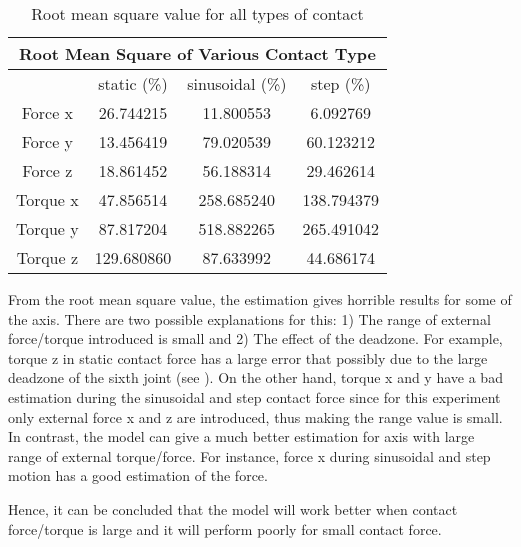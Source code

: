 \begin{table}[H]
    \centering
    \begin{tabular}{| c | c | c | c |}
    \hline
    \multicolumn{4}{|c|}{Root Mean Square of Various Contact Type} \\\hline
              & static (\%) & sinusoidal (\%)  & step (\%)    \\ \hline
    Force x   & 26.744215   &  11.800553       &  6.092769    \\ \hline
    Force y   & 13.456419   &  79.020539       &  60.123212   \\ \hline
    Force z   & 18.861452   &  56.188314       &  29.462614   \\ \hline
    Torque x  & 47.856514   &  258.685240      &  138.794379  \\ \hline
    Torque y  & 87.817204   &  518.882265      &  265.491042  \\ \hline
    Torque z  & 129.680860  &  87.633992       &  44.686174   \\ \hline
    \end{tabular}
    \caption{Root mean square value for all types of contact}
    \label{table:rmse 2}
\end{table}

From the root mean square value, the estimation gives horrible results for some of the axis. There are two possible explanations for this: 1) The range of external force/torque introduced is small and 2) The effect of the deadzone. For example, torque z in static contact force has a large error that possibly due to the large deadzone of the sixth joint (see ). On the other hand, torque x and y have a bad estimation during the sinusoidal and step contact force since for this experiment only external force x and z are introduced, thus making the range value is small. In contrast, the model can give a much better estimation for axis with large range of external torque/force. For instance, force x during sinusoidal and step motion has a good estimation of the force. 

Hence, it can be concluded that the model will work better when contact force/torque is large and it will perform poorly for small contact force. 
